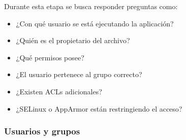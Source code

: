 \documentclass[a4paper,10pt]{article}
\begin{document}
Durante esta etapa se busca responder preguntas como:

\begin{itemize}
\item ¿Con qué usuario se está ejecutando la aplicación?
\item ¿Quién es el propietario del archivo?
\item ¿Qué permisos posee?
\item ¿El usuario pertenece al grupo correcto?
\item ¿Existen ACLs adicionales?
\item ¿SELinux o AppArmor están restringiendo el acceso?
\end{itemize}


\subsubsection{Usuarios y grupos}
\end{document}
